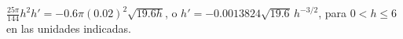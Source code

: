 $\frac{25\pi}{144}h^2h'=-0.6\pi(0.02)^2\sqrt{19.6h}$, o $h'=-0.0013824\sqrt{19.6}\,h^{-3/2}$, para $0<h\le6$ en las unidades indicadas.
